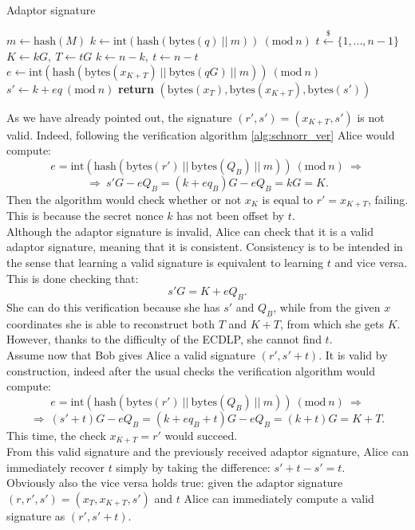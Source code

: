 \begin{algorithm}
	\caption{Adaptor signature}
	\label{alg:adaptor}
	\begin{algorithmic}[1]
		\State $m \gets \text{hash}(M)$
		\State $k \gets \text{int}(\text{hash}(\text{bytes}(q) \ || \ m)) \ (\text{mod} \ n)$
		\State $t \xleftarrow{\text{\$}} \{1, ..., n - 1\}$
		\State $K \gets kG, \ T \gets tG$
		\State $k \gets n - k, \ t \gets n - t$
		\EndIf
		\State $e \gets \text{int}(\text{hash}(\text{bytes}(x_{K + T}) \ || \ \text{bytes}(qG) \ || \ m)) \ (\text{mod} \ n)$
		\State $s' \gets k + eq \ (\text{mod} \ n)$
		\State \textbf{return} $(\text{bytes}(x_T), \text{bytes}(x_{K + T}), \text{bytes}(s'))$
		\EndProcedure
	\end{algorithmic}
\end{algorithm}

\bigskip
\noindent
As we have already pointed out, the signature $(r', s') = (x_{K + T}, s')$ is not valid. Indeed, following the verification algorithm \ref{alg:schnorr_ver} Alice would compute:
$$e = \text{int}(\text{hash}(\text{bytes}(r') \ || \ \text{bytes}(Q_B) \ || \ m)) \ (\text{mod} \ n) \ \Longrightarrow$$
$$\Longrightarrow \ s'G - eQ_B = (k + eq_B)G - eQ_B = kG = K.$$
Then the algorithm would check whether or not $x_K$ is equal to $r' = x_{K + T}$, failing. This is because the secret nonce $k$ has not been offset by $t$.
\\
Although the adaptor signature is invalid, Alice can check that it is a valid adaptor signature, meaning that it is consistent. Consistency is to be intended in the sense that learning a valid signature is equivalent to learning $t$ and vice versa. This is done checking that:
$$s'G = K + eQ_B.$$
She can do this verification because she has $s'$ and $Q_B$, while from the given $x$ coordinates she is able to reconstruct both $T$ and $K + T$, from which she gets $K$. However, thanks to the difficulty of the ECDLP, she cannot find $t$.
\\
Assume now that Bob gives Alice a valid signature $(r', s' + t)$. It is valid by construction, indeed after the usual checks the verification algorithm would compute:
$$e = \text{int}(\text{hash}(\text{bytes}(r') \ || \ \text{bytes}(Q_B) \ || \ m)) \ (\text{mod} \ n) \ \Longrightarrow$$
$$\Longrightarrow \ (s' + t)G - eQ_B = (k + eq_B + t)G - eQ_B = (k + t)G = K + T.$$
This time, the check $x_{K + T} = r'$ would succeed. 
\\
From this valid signature and the previously received adaptor signature, Alice can immediately recover $t$ simply by taking the difference: $s' + t - s' = t$.
\\
Obviously also the vice versa holds true: given the adaptor signature $(r, r', s') = (x_T, x_{K + T}, s')$ and $t$ Alice can immediately compute a valid signature as $(r', s' + t)$.


